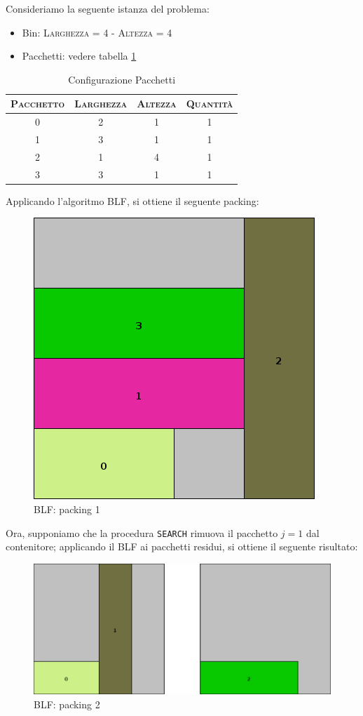 Consideriamo la seguente istanza del problema:
\begin{itemize}[noitemsep]
   \item Bin: \textsc{Larghezza = 4} - \textsc{Altezza = 4}
   \item Pacchetti: vedere tabella \ref{table:packets}
\end{itemize}
\begin{table}[htp]
  \small\centering
  \begin{tabular}{c|ccc}
    \toprule
    \textsc{Pacchetto} & \textsc{Larghezza} & \textsc{Altezza} & \textsc{Quantità}\\
    \midrule
    0 & 2 & 1 & 1\\
    1 & 3 & 1 & 1\\
    2 & 1 & 4 & 1\\
    3 & 3 & 1 & 1\\
    \bottomrule
  \end{tabular}
  \caption{Configurazione Pacchetti}
  \label{table:packets}
\end{table}

Applicando l'algoritmo BLF, si ottiene il seguente packing:

\begin{figure}[h]
  \centering
  \includegraphics[height=0.3\textwidth]{./img/inconv1.png}
  \caption{BLF: packing 1}
\end{figure}

Ora, supponiamo che la procedura \texttt{SEARCH} rimuova il pacchetto $j=1$ dal contenitore; applicando il BLF ai pacchetti residui, si ottiene il seguente risultato:

\begin{figure}[h]
  \centering
  \includegraphics[height=0.3\textwidth]{./img/inconv2.png}
  \caption{BLF: packing 2}
  \label{img:inconv2}
\end{figure}

